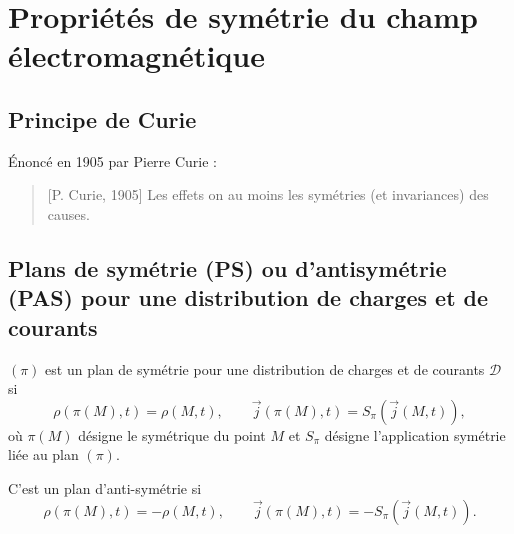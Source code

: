 \section[Propriétés de symétrie]{Propriétés de symétrie du champ électromagnétique}

    \subsection{Principe de Curie}

        Énoncé en 1905 par Pierre Curie :
        \begin{quote}[P. Curie, 1905]
            Les effets on au moins les symétries (et invariances) des causes.
        \end{quote}

    \subsection{Plans de symétrie (PS) ou d'antisymétrie (PAS) pour une distribution de charges et de courants}

        $(\pi)$ est un plan de symétrie pour une distribution de charges et de courants $\mathcal{D}$ si 
        \begin{equation}
            \rho(\pi(M),t)=\rho(M,t),\qquad \vec{j}(\pi(M),t)=S_{\pi}(\vec{j}(M,t)),
        \end{equation}
        où $\pi(M)$ désigne le symétrique du point $M$ et $S_{\pi}$ désigne l'application symétrie liée au plan $(\pi)$.

        C'est un plan d'anti-symétrie si
        \begin{equation}
            \rho(\pi(M),t)=-\rho(M,t),\qquad \vec{j}(\pi(M),t)=-S_{\pi}(\vec{j}(M,t)).
        \end{equation}

